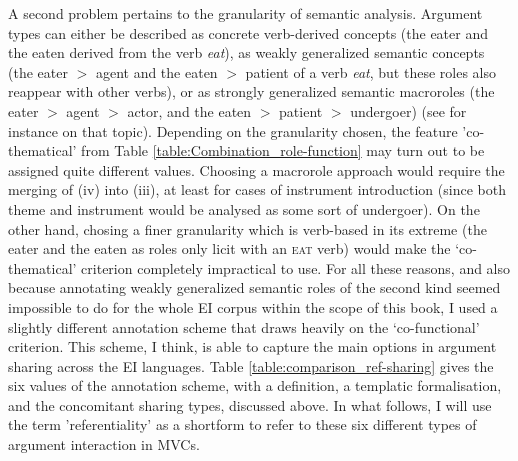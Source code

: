 A second problem pertains to the granularity of semantic analysis. Argument types can either be described as concrete verb-derived concepts (the eater and the eaten derived from the verb \textit{eat}), as weakly generalized semantic concepts (the eater $>$ agent and the eaten $>$ patient of a verb \textit{eat}, but these roles also reappear with other verbs), or as strongly generalized semantic macroroles (the eater $>$ agent $>$ actor, and the eaten $>$ patient $>$ undergoer) (see for instance \citealt{van1997syntax} on that topic). Depending on the granularity chosen, the feature 'co-thematical' from Table \ref{table:Combination_role-function} may turn out to be assigned quite different values. Choosing a macrorole approach would require the merging of (iv) into (iii), at least for cases of instrument introduction (since both theme and instrument would be analysed as some sort of undergoer). On the other hand, chosing a finer granularity which is verb-based in its extreme (the eater and the eaten as roles only licit with an \textsc{eat} verb) would make the `co-thematical' criterion completely impractical to use. For all these reasons, and also because annotating weakly generalized semantic roles of the second kind seemed impossible to do for the whole EI corpus within the scope of this book, I used a slightly different annotation scheme that draws heavily on the `co-functional' criterion. This scheme, I think, is able to capture the main options in argument sharing across the EI languages. Table \ref{table:comparison_ref-sharing} gives the six values of the annotation scheme, with a definition, a templatic formalisation, and the concomitant sharing types, discussed above. In what follows, I will use the term 'referentiality' as a shortform to refer to these six different types of argument interaction in MVCs.

